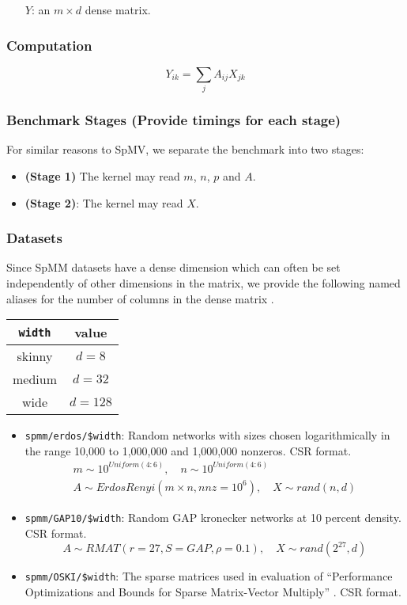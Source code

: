 \documentclass{article}
\begin{document}
\begin{itemize}
	\item[$Y$:] an $m \times d$ dense matrix.
\end{itemize}

\subsubsection{Computation}

$$Y_{ik} = \sum_{j}A_{ij}X_{jk}$$

\subsubsection{Benchmark Stages (Provide timings for each stage)}

For similar reasons to SpMV, we separate the benchmark into two stages:

\begin{itemize}
\item \textbf{(Stage 1)}
	The kernel may read $m$, $n$, $p$ and $A$.
\item \textbf{(Stage 2)}:
	The kernel may read $X$.
\end{itemize}

\subsubsection{Datasets}

	Since SpMM datasets have a dense dimension which can often be set independently
	of other dimensions in the matrix, we provide the following named aliases for the number of columns in the dense matrix \cite{yesil_dense_2022}.

    \begin{tabular}{|c|c|}\hline
        \texttt{width} & value\\
        \hline
        skinny & $d = 8$\\
        medium & $d = 32$\\
        wide & $d = 128$\\\hline
    \end{tabular}

\begin{itemize}
	\item \texttt{spmm/erdos/\$width}: Random networks with sizes chosen logarithmically in the range 10,000 to 1,000,000 and 1,000,000 nonzeros. CSR format.
	\begin{multline*}
		m \sim 10^{Uniform(4:6)}, \quad n \sim 10^{Uniform(4:6)} \\
			A \sim ErdosRenyi\left(m\times n, nnz=10^6\right), \quad X \sim rand(n, d)
	\end{multline*}
	\item \texttt{spmm/GAP10/\$width}: Random GAP kronecker networks at 10 percent
	density. CSR format.
	\[
		A \sim RMAT\left(r=27, S = GAP, \rho = 0.1\right), \quad X \sim rand(2^{27}, d)
	\]
	\item \texttt{spmm/OSKI/\$width}: The sparse matrices used in evaluation of
	``Performance Optimizations and Bounds for Sparse Matrix-Vector Multiply'' \cite{vuduc_performance_2002}. CSR format.
\end{itemize}
\end{document}
